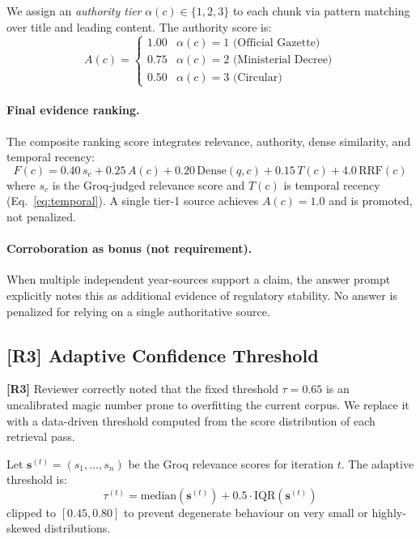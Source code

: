 \documentclass[12pt,a4paper]{article}
\newcommand{\response}[2]{%
  \vspace{4pt}
  \noindent\colorbox{yellow!20}{\parbox{\dimexpr\linewidth-2\fboxsep}{%
    \small\textbf{\color{revcolor}[R#1]} #2}}\vspace{4pt}}
\begin{document}
We assign an \emph{authority tier} $\alpha(c) \in \{1, 2, 3\}$ to each chunk via
pattern matching over title and leading content. The authority score is:
\begin{equation}
A(c) = \begin{cases}
1.00 & \alpha(c) = 1 \text{ (Official Gazette)} \\
0.75 & \alpha(c) = 2 \text{ (Ministerial Decree)} \\
0.50 & \alpha(c) = 3 \text{ (Circular)}
\end{cases}
\label{eq:authority}
\end{equation}

\paragraph{Final evidence ranking.} The composite ranking score integrates
relevance, authority, dense similarity, and temporal recency:
\begin{equation}
F(c) = 0.40\,s_c + 0.25\,A(c) + 0.20\,\text{Dense}(q,c) + 0.15\,T(c) + 4.0\,\text{RRF}(c)
\label{eq:final_rank}
\end{equation}
where $s_c$ is the Groq-judged relevance score and $T(c)$ is temporal recency
(Eq.~\ref{eq:temporal}). A single tier-1 source achieves $A(c)=1.0$ and is
promoted, not penalized.

\paragraph{Corroboration as bonus (not requirement).} When multiple independent
year-sources support a claim, the answer prompt explicitly notes this as
additional evidence of regulatory stability. No answer is penalized for
relying on a single authoritative source.

\subsection{[R3] Adaptive Confidence Threshold}
\label{sec:adaptive}

\response{3}{Reviewer correctly noted that the fixed threshold $\tau=0.65$ is an
uncalibrated magic number prone to overfitting the current corpus. We replace it
with a data-driven threshold computed from the score distribution of each retrieval
pass.}

Let $\mathbf{s}^{(t)} = (s_1, \ldots, s_n)$ be the Groq relevance scores for
iteration $t$. The adaptive threshold is:
\begin{equation}
\tau^{(t)} = \text{median}(\mathbf{s}^{(t)}) + 0.5 \cdot \text{IQR}(\mathbf{s}^{(t)})
\label{eq:adaptive_threshold}
\end{equation}
clipped to $[0.45, 0.80]$ to prevent degenerate behaviour on very small or
highly-skewed distributions.
\end{document}
